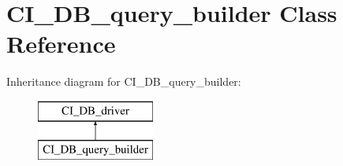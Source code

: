 \hypertarget{class_c_i___d_b__query__builder}{}\section{C\+I\+\_\+\+D\+B\+\_\+query\+\_\+builder Class Reference}
\label{class_c_i___d_b__query__builder}
Inheritance diagram for C\+I\+\_\+\+D\+B\+\_\+query\+\_\+builder\+:\begin{figure}[H]
\begin{center}
\leavevmode
\includegraphics[height=2.000000cm]{class_c_i___d_b__query__builder}
\end{center}
\end{figure}
